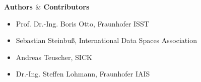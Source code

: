 
\vspace{\baselineskip}
\vspace{\baselineskip}
\begin{multicols}{2}
\textbf{Authors $\&$  Contributors}\par


\vspace{\baselineskip}

\end{multicols}
\begin{itemize}
	\item Prof. Dr.-Ing. Boris Otto, Fraunhofer ISST 

	\item Sebastian Steinbuß, International Data Spaces Association 

	\item Andreas Teuscher, SICK 

	\item Dr.-Ing. Steffen Lohmann, Fraunhofer IAIS 
\end{itemize}

